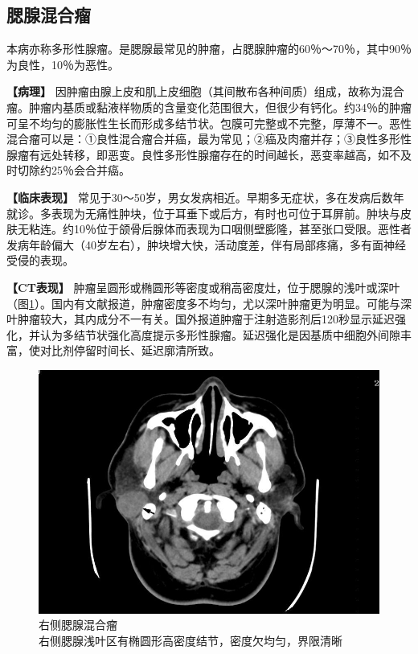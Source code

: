 \subsection{腮腺混合瘤}

本病亦称多形性腺瘤。是腮腺最常见的肿瘤，占腮腺肿瘤的60％～70％，其中90％为良性，10％为恶性。

\textbf{【病理】}
因肿瘤由腺上皮和肌上皮细胞（其间散布各种间质）组成，故称为混合瘤。肿瘤内基质或黏液样物质的含量变化范围很大，但很少有钙化。约34％的肿瘤可呈不均匀的膨胀性生长而形成多结节状。包膜可完整或不完整，厚薄不一。恶性混合瘤可以是：①良性混合瘤合并癌，最为常见；②癌及肉瘤并存；③良性多形性腺瘤有远处转移，即恶变。良性多形性腺瘤存在的时间越长，恶变率越高，如不及时切除约25％会合并癌。

\textbf{【临床表现】}
常见于30～50岁，男女发病相近。早期多无症状，多在发病后数年就诊。多表现为无痛性肿块，位于耳垂下或后方，有时也可位于耳屏前。肿块与皮肤无粘连。约10％位于颌骨后腺体而表现为口咽侧壁膨隆，甚至张口受限。恶性者发病年龄偏大（40岁左右），肿块增大快，活动度差，伴有局部疼痛，多有面神经受侵的表现。

\textbf{【CT表现】}
肿瘤呈圆形或椭圆形等密度或稍高密度灶，位于腮腺的浅叶或深叶（图\ref{fig7-5}）。国内有文献报道，肿瘤密度多不均匀，尤以深叶肿瘤更为明显。可能与深叶肿瘤较大，其内成分不一有关。国外报道肿瘤于注射造影剂后120秒显示延迟强化，并认为多结节状强化高度提示多形性腺瘤。延迟强化是因基质中细胞外间隙丰富，使对比剂停留时间长、延迟廓清所致。

\begin{figure}[!htbp]
 \centering
 \includegraphics[width=.7\textwidth,height=\textheight,keepaspectratio]{./images/Image00162.jpg}
 \captionsetup{justification=centering}
 \caption{右侧腮腺混合瘤\\{\small 右侧腮腺浅叶区有椭圆形高密度结节，密度欠均匀，界限清晰}}
 \label{fig7-5}
  \end{figure} 


